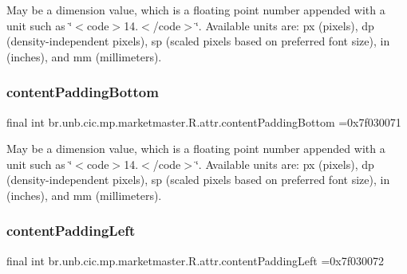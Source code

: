 May be a dimension value, which is a floating point number appended with a unit such as \char`\"{}$<$code$>$14.\+5sp$<$/code$>$\char`\"{}. Available units are\+: px (pixels), dp (density-\/independent pixels), sp (scaled pixels based on preferred font size), in (inches), and mm (millimeters). \mbox{\label{classbr_1_1unb_1_1cic_1_1mp_1_1marketmaster_1_1R_1_1attr_a114b163633c1eaca895eb604952430d0}} 
\subsubsection{\texorpdfstring{content\+Padding\+Bottom}{contentPaddingBottom}}
{\footnotesize\ttfamily final int br.\+unb.\+cic.\+mp.\+marketmaster.\+R.\+attr.\+content\+Padding\+Bottom =0x7f030071\hspace{0.3cm}{\ttfamily [static]}}

May be a dimension value, which is a floating point number appended with a unit such as \char`\"{}$<$code$>$14.\+5sp$<$/code$>$\char`\"{}. Available units are\+: px (pixels), dp (density-\/independent pixels), sp (scaled pixels based on preferred font size), in (inches), and mm (millimeters). \mbox{\label{classbr_1_1unb_1_1cic_1_1mp_1_1marketmaster_1_1R_1_1attr_aeb220e92c6cc167fed73271e7de9d4b6}} 
\subsubsection{\texorpdfstring{content\+Padding\+Left}{contentPaddingLeft}}
{\footnotesize\ttfamily final int br.\+unb.\+cic.\+mp.\+marketmaster.\+R.\+attr.\+content\+Padding\+Left =0x7f030072\hspace{0.3cm}{\ttfamily [static]}}

